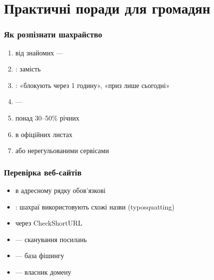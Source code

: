 ﻿\chapter{Практичні поради для громадян}
\label{apdx:practical}

\subsection*{Як розпізнати шахрайство}

\begin{enumerate}[label=\arabic*)]
\item {} від знайомих — 
\item {}:  замість 
\item {}: «блокують через 1 годину», «приз лише сьогодні»
\item {} — 
\item {} понад 30--50\% річних
\item {} в офіційних листах
\item {} або нерегульованими сервісами
\end{enumerate}

\subsection*{Перевірка веб-сайтів}

\begin{itemize}[label=--]
\item {} в адресному рядку обов'язкові
\item {}: шахраї використовують схожі назви (typosquatting)
\item {} через CheckShortURL
\end{itemize}

\begin{itemize}[label=--]
\item {} — сканування посилань
\item {} — база фішингу
\item {} — власник домену
\end{itemize}

